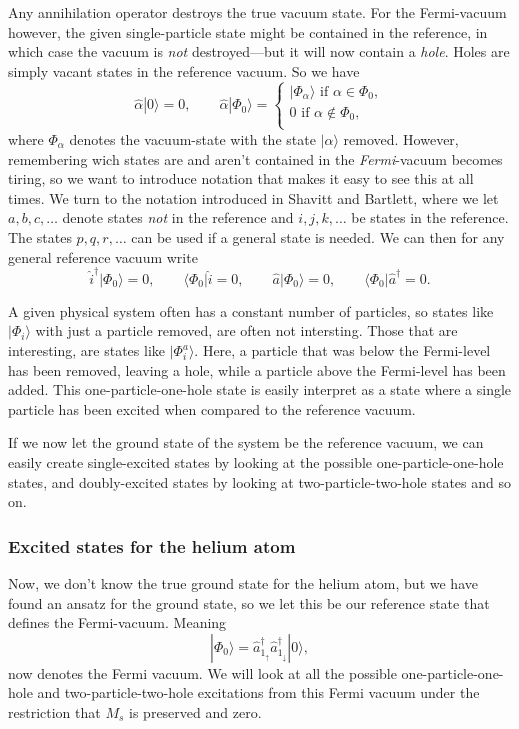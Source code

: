 \documentclass[a4paper, 11pt, notitlepage, english]{article}
\newcommand{\bra}[1]{\langle #1|}
\newcommand{\ket}[1]{|#1 \rangle}
\newcommand{\op}[1]{\hat{#1}}
\renewcommand{\d}{{\rm d}}
\renewcommand{\u}{\uparrow}
\renewcommand{\d}{\downarrow}
\begin{document}
Any annihilation operator destroys the true vacuum state. For the Fermi-vacuum however, the given single-particle state might be contained in the reference, in which case the vacuum is \emph{not} destroyed---but it will now contain a \emph{hole}. Holes are simply vacant states in the reference vacuum. So we have
$$\op{\alpha} \ket{0} = 0, \qquad \op{\alpha} \ket{\Phi_0} = \begin{cases}
	\ket{\Phi_\alpha} \mbox{ if } \alpha \in \Phi_0, \\
	0 \mbox{ if } \alpha \not\in \Phi_0, \\
\end{cases}$$
where $\Phi_\alpha$ denotes the vacuum-state with the state $\ket{\alpha}$ removed. However, remembering wich states are and aren't contained in the \emph{Fermi}-vacuum becomes tiring, so we want to introduce notation that makes it easy to see this at all times. We turn to the notation introduced in Shavitt and Bartlett, where we let $a, b, c,\ldots$ denote states \emph{not} in the reference and $i,j,k, \ldots$ be states in the reference. The states $p,q,r,\ldots$ can be used if a general state is needed. We can then for any general reference vacuum write
$$\op{i}^\dag \ket{\Phi_0} = 0, \qquad \bra{\Phi_0} \op{i} = 0, \qquad \op{a}\ket{\Phi_0} = 0, \qquad \bra{\Phi_0}\op{a}^\dag = 0.$$

A given physical system often has a constant number of particles, so states like $\ket{\Phi_i}$ with just a particle removed, are often not intersting. Those that are interesting, are states like $\ket{\Phi_i^a}$. Here, a particle that was below the Fermi-level has been removed, leaving a hole, while a particle above the Fermi-level has been added. This one-particle-one-hole state is easily interpret as a state where a single particle has been excited when compared to the reference vacuum.

If we now let the ground state of the system be the reference vacuum, we can easily create single-excited states by looking at the possible one-particle-one-hole states, and doubly-excited states by looking at two-particle-two-hole states and so on.

\clearpage

\subsubsection*{Excited states for the helium atom}
Now, we don't know the true ground state for the helium atom, but we have found an ansatz for the ground state, so we let this be our reference state that defines the Fermi-vacuum. Meaning 
$$\ket{\Phi_0} = \op{a}_{1_\u}^\dagger\op{a}_{1_\d}^\dagger\ket{0},$$
now denotes the Fermi vacuum. We will look at all the possible one-particle-one-hole and two-particle-two-hole excitations from this Fermi vacuum under the restriction that $M_s$ is preserved and zero.
\end{document}

